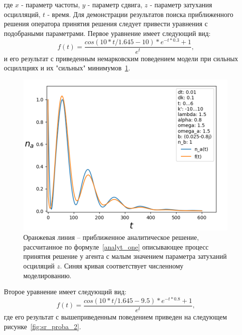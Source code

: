 где $x$ - параметр частоты, $y$ - параметр сдвига, $z$ - параметр затухания осцилляций, $t$ - время.
Для демонстрации результатов поиска приближенного решения оператора принятия решения следует привести
уравнения с подобраными параметрами.
Первое уравнение имеет следующий вид:
\begin{equation}\label{analyt_one}
    f(t) = \frac{cos(10*t/1.645 - 10)*e^{-t*0.3} + 1}{e^{t}},
\end{equation}
и его результат с приведенным немарковским поведением модели при сильных осциллциях и их "сильных" минимумов~\ref{fig:sr_proba_1}.
\begin{figure}[h!]
    \centering
    \captionsetup{justification=centering}
    \includegraphics[width=0.7\linewidth]{pictures/result_second_5.png}
    \caption{Оранжевая линия – приближенное аналитическое решение, рассчитанное по формуле~\eqref{analyt_one}
    описывающее процесс принятия решение у агента с малым значением параметра затуханий осциляций $z$.
    Синяя кривая соответствует численному моделированию.}
    \label{fig:sr_proba_1}
\end{figure}
Второе уравнение имеет следующий вид:
\begin{equation}\label{analyt_two}
    f(t) = \frac{cos(10*t/1.645 - 9.5)*e^{-t*0.8} + 1}{e^{t}},
\end{equation}
где его результат с вышеприведенным поведением приведен на следующем рисунке~\ref{fig:sr_proba_2}.
\newpage

